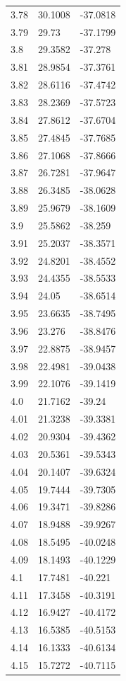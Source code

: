 \begin{table}
\begin{tabular}{lll}
3.78 & 30.1008 & -37.0818 \\
3.79 & 29.73 & -37.1799 \\
3.8 & 29.3582 & -37.278 \\
3.81 & 28.9854 & -37.3761 \\
3.82 & 28.6116 & -37.4742 \\
3.83 & 28.2369 & -37.5723 \\
3.84 & 27.8612 & -37.6704 \\
3.85 & 27.4845 & -37.7685 \\
3.86 & 27.1068 & -37.8666 \\
3.87 & 26.7281 & -37.9647 \\
3.88 & 26.3485 & -38.0628 \\
3.89 & 25.9679 & -38.1609 \\
3.9 & 25.5862 & -38.259 \\
3.91 & 25.2037 & -38.3571 \\
3.92 & 24.8201 & -38.4552 \\
3.93 & 24.4355 & -38.5533 \\
3.94 & 24.05 & -38.6514 \\
3.95 & 23.6635 & -38.7495 \\
3.96 & 23.276 & -38.8476 \\
3.97 & 22.8875 & -38.9457 \\
3.98 & 22.4981 & -39.0438 \\
3.99 & 22.1076 & -39.1419 \\
4.0 & 21.7162 & -39.24 \\
4.01 & 21.3238 & -39.3381 \\
4.02 & 20.9304 & -39.4362 \\
4.03 & 20.5361 & -39.5343 \\
4.04 & 20.1407 & -39.6324 \\
4.05 & 19.7444 & -39.7305 \\
4.06 & 19.3471 & -39.8286 \\
4.07 & 18.9488 & -39.9267 \\
4.08 & 18.5495 & -40.0248 \\
4.09 & 18.1493 & -40.1229 \\
4.1 & 17.7481 & -40.221 \\
4.11 & 17.3458 & -40.3191 \\
4.12 & 16.9427 & -40.4172 \\
4.13 & 16.5385 & -40.5153 \\
4.14 & 16.1333 & -40.6134 \\
4.15 & 15.7272 & -40.7115 \\

\end{tabular}
\end{table}
